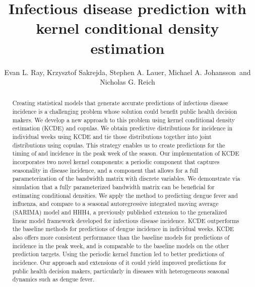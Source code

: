 \documentclass[times, doublespace]{simauth}\usepackage[]{graphicx}\usepackage[]{color}
\begin{document}


\title{Infectious disease prediction with\\
kernel conditional density estimation}

\author{Evan L. Ray\corrauth,
Krzysztof Sakrejda,
Stephen A. Lauer,
Michael A. Johansson\ and
Nicholas G. Reich}

\address{
Department of Biostatistics and Epidemiology, School of Public Health and Health Sciences, University of Massachusetts, Amherst, 415 Arnold House, 715 N. Pleasant Street, Amherst, MA 01003, USA\\
Dengue Branch, Division of Vector-Borne Infectious Diseases, Centers for Disease Control and Prevention, San Juan, Puerto Rico, USA
}


\begin{abstract}
Creating statistical models that generate accurate predictions of
infectious disease incidence is a challenging
problem whose solution could benefit public health decision makers.
We develop a new approach to this problem using
kernel conditional density estimation (KCDE) and copulas.  We obtain
predictive distributions for incidence in individual weeks using KCDE and tie those
distributions together into joint distributions using copulas. This strategy enables us to create
predictions for the timing of and incidence in the peak week of the season.
Our implementation of KCDE incorporates two novel kernel components: a periodic
component that captures seasonality in disease incidence, and a component that
allows for a full parameterization of the bandwidth matrix with discrete
variables.  We demonstrate via simulation that a fully parameterized
bandwidth matrix can be beneficial for estimating conditional densities.
We apply the method to predicting dengue fever and influenza, and compare to
a seasonal autoregressive integrated moving average
(SARIMA) model and HHH4, a previously published extension to the generalized linear
model framework developed for infectious disease incidence.
KCDE outperforms the baseline methods for
predictions of dengue incidence in individual weeks.  KCDE also offers more
consistent performance than the baseline models for predictions of
incidence in the peak week, and is comparable to the baseline models on the
other prediction targets.  Using the periodic kernel function led to better
predictions of incidence.  Our approach and extensions of
it could yield improved predictions for public health decision makers,
particularly in diseases with heterogeneous seasonal dynamics such as dengue fever.
\end{abstract}
\end{document}
